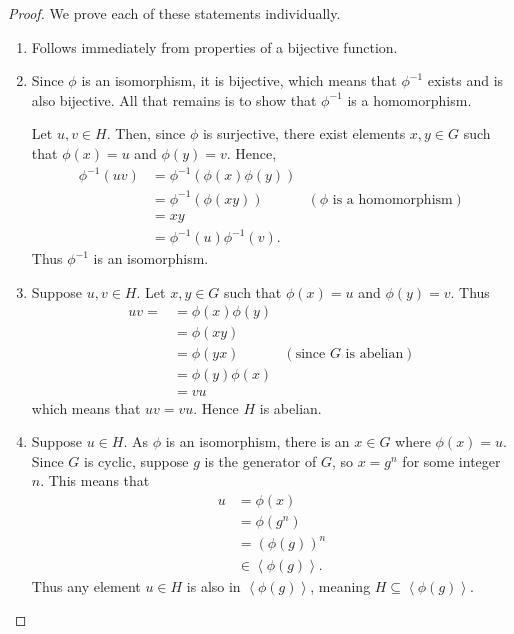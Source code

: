 \begin{proof}
    We prove each of these statements individually.
    \begin{enumerate}
        \item Follows immediately from properties of a bijective function.

        \item Since $\phi$ is an isomorphism, it is bijective, which means that $\phi^{-1}$ exists and is also bijective. All that remains is to show that $\phi^{-1}$ is a homomorphism.

        Let $u, v \in H$. Then, since $\phi$ is surjective, there exist elements $x, y \in G$ such that $\phi(x) = u$ and $\phi(y) = v$. Hence,
        \begin{align*}
            \phi^{-1}(uv) &= \phi^{-1}\left(\phi(x)\phi(y)\right)\\
            &= \phi^{-1}\left(\phi(xy)\right) & (\phi \text{ is a homomorphism})\\
            &= xy\\
            &= \phi^{-1}(u) \phi^{-1}(v).
        \end{align*}
        Thus $\phi^{-1}$ is an isomorphism.

        \item Suppose $u, v \in H$. Let $x, y \in G$ such that $\phi(x) = u$ and $\phi(y) = v$. Thus
        \begin{align*}
            uv = &= \phi(x)\phi(y) \\
            &= \phi(xy)\\
            &= \phi(yx) & (\text{since } G \text{ is abelian})\\
            &= \phi(y)\phi(x)\\
            &= vu
        \end{align*}
        which means that $uv = vu$. Hence $H$ is abelian.

        \item Suppose $u \in H$. As $\phi$ is an isomorphism, there is an $x \in G$ where $\phi(x) = u$. Since $G$ is cyclic, suppose $g$ is the generator of $G$, so $x = g^n$ for some integer $n$. This means that
        \begin{align*}
            u &= \phi(x)\\
            &= \phi(g^n)\\
            &= \left(\phi(g)\right)^n\\
            &\in \left\langle \phi(g) \right\rangle.
        \end{align*}
        Thus any element $u \in H$ is also in $\left\langle \phi(g) \right\rangle$, meaning $H \subseteq \left\langle \phi(g) \right\rangle$.


\end{enumerate}
\end{proof}

